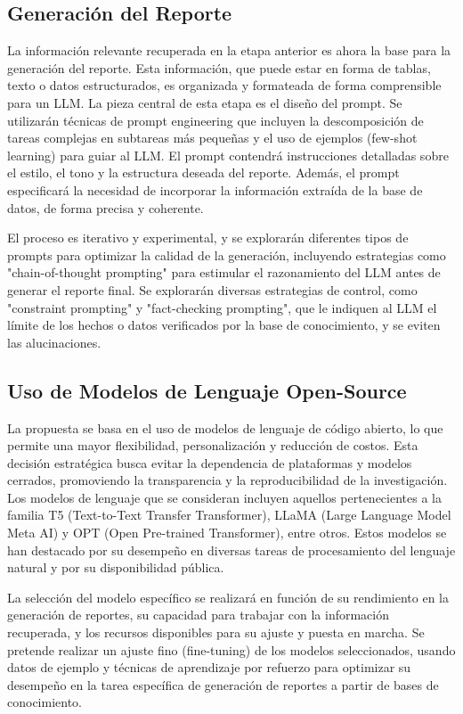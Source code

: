 \subsection{Generación del Reporte}

La información relevante recuperada en la etapa anterior es ahora la base para la generación del reporte. Esta información, que puede estar en forma de tablas, texto o datos estructurados, es organizada y formateada de forma comprensible para un LLM. La pieza central de esta etapa es el diseño del prompt. Se utilizarán técnicas de prompt engineering que incluyen la descomposición de tareas complejas en subtareas más pequeñas y el uso de ejemplos (few-shot learning) para guiar al LLM. El prompt contendrá instrucciones detalladas sobre el estilo, el tono y la estructura deseada del reporte. Además, el prompt especificará la necesidad de incorporar la información extraída de la base de datos, de forma precisa y coherente.

El proceso es iterativo y experimental, y se explorarán diferentes tipos de prompts para optimizar la calidad de la generación, incluyendo estrategias como "chain-of-thought prompting" para estimular el razonamiento del LLM antes de generar el reporte final. Se explorarán diversas estrategias de control, como "constraint prompting" y "fact-checking prompting", que le indiquen al LLM el límite de los hechos o datos verificados por la base de conocimiento, y se eviten las alucinaciones.

\subsection{Uso de Modelos de Lenguaje Open-Source}

La propuesta se basa en el uso de modelos de lenguaje de código abierto, lo que permite una mayor flexibilidad, personalización y reducción de costos. Esta decisión estratégica busca evitar la dependencia de plataformas y modelos cerrados, promoviendo la transparencia y la reproducibilidad de la investigación. Los modelos de lenguaje que se consideran incluyen aquellos pertenecientes a la familia T5 (Text-to-Text Transfer Transformer), LLaMA (Large Language Model Meta AI) y OPT (Open Pre-trained Transformer), entre otros. Estos modelos se han destacado por su desempeño en diversas tareas de procesamiento del lenguaje natural y por su disponibilidad pública.

La selección del modelo específico se realizará en función de su rendimiento en la generación de reportes, su capacidad para trabajar con la información recuperada, y los recursos disponibles para su ajuste y puesta en marcha. Se pretende realizar un ajuste fino (fine-tuning) de los modelos seleccionados, usando datos de ejemplo y técnicas de aprendizaje por refuerzo para optimizar su desempeño en la tarea específica de generación de reportes a partir de bases de conocimiento.

